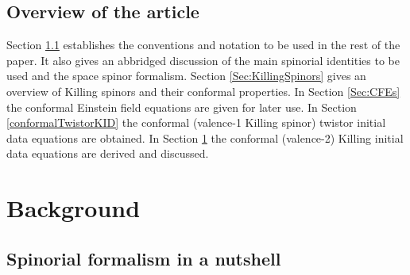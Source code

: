 \documentclass[10pt,a4paper]{article}
\theoremstyle{plain}
\begin{document}
\newpage

\subsection*{Overview of the article}
{\color{blue}
Section \ref{NotationAndSpinorFormalism} establishes the
conventions and notation to be used in the rest of the paper.  It also
gives an abbridged discussion of the main spinorial identities to be
used and the space spinor formalism.  Section \ref{Sec:KillingSpinors}
gives an overview of Killing spinors and their conformal
properties. In Section \ref{Sec:CFEs}  the conformal
Einstein field equations are given for later use.  In Section
\ref{conformalTwistorKID} the conformal (valence-1 Killing spinor)
twistor initial data equations are obtained. In Section
\ref{} the conformal (valence-2) Killing initial data equations are
derived and discussed.}



\section{Background}
\subsection{Spinorial formalism in a nutshell}
\label{NotationAndSpinorFormalism}
\end{document}
